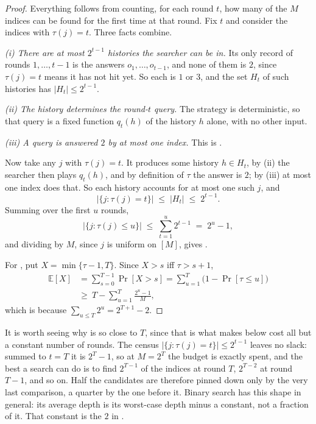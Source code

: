 \documentclass[letterpaper,9pt,twocolumn]{extarticle}
\newcommand{\EE}{\mathbb{E}}
\theoremstyle{plain}
\theoremstyle{definition}
\theoremstyle{remark}
\begin{document}
\begin{proof}
Everything follows from counting, for each round $t$, how many of the $M$
indices can be found for the first time at that round. Fix $t$ and consider
the indices with $\tau(j)=t$. Three facts combine.

\emph{(i) There are at most $2^{t-1}$ histories the searcher can be in.}
Its only record of rounds $1,\dots,t-1$ is the answers $o_1,\dots,o_{t-1}$,
and none of them is $2$, since $\tau(j)=t$ means it has not hit yet. So each
is $1$ or $3$, and the set $H_t$ of such histories has $|H_t|\le 2^{t-1}$.

\emph{(ii) The history determines the round-$t$ query.} The strategy is
deterministic, so that query is a fixed function $q_t(h)$ of the history $h$
alone, with no other input.

\emph{(iii) A query is answered $2$ by at most one index.} This is
.

Now take any $j$ with $\tau(j)=t$. It produces some history $h\in H_t$, by
(ii) the searcher then plays $q_t(h)$, and by definition of $\tau$ the answer
is $2$; by (iii) at most one index does that. So each history accounts for at
most one such $j$, and
\begin{equation*}
|\{j:\tau(j)=t\}|\;\le\;|H_t|\;\le\;2^{t-1}.
\end{equation*}
Summing over the first $u$ rounds,
\begin{equation*}
|\{j:\tau(j)\le u\}|\;\le\;\sum_{t=1}^{u}2^{t-1}\;=\;2^{u}-1,
\end{equation*}
and dividing by $M$, since $j$ is uniform on $[M]$, gives
.

For , put $X=\min\{\tau-1,T\}$. Since $X>s$ iff
$\tau>s+1$,
\begin{align*}
\EE[X]&=\sum_{s=0}^{T-1}\Pr[X>s]=\sum_{u=1}^{T}\bigl(1-\Pr[\tau\le u]\bigr)\\
&\ge\ T-\sum_{u=1}^{T}\frac{2^{u}-1}{M},
\end{align*}
which is  because $\sum_{u\le T}2^u=2^{T+1}-2$.
\end{proof}

It is worth seeing why  is so close to $T$, since that is
what makes  below cost all but a constant number of
rounds. The census $|\{j:\tau(j)=t\}|\le 2^{t-1}$ leaves no slack: summed to
$t=T$ it is $2^{T}-1$, so at $M=2^{T}$ the budget is exactly spent, and the
best a search can do is to find $2^{T-1}$ of the indices at round $T$,
$2^{T-2}$ at round $T-1$, and so on. Half the candidates are therefore pinned
down only by the very last comparison, a quarter by the one before it. Binary
search has this shape in general: its average depth is its worst-case depth
minus a constant, not a fraction of it. That constant is the $2$ in
.
\end{document}
